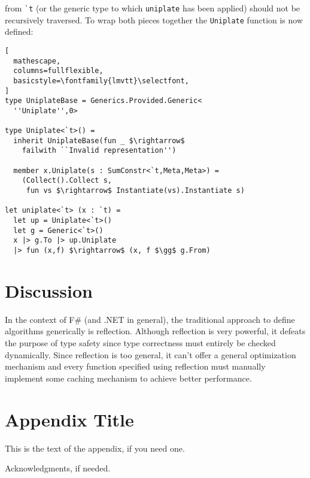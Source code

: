 \documentclass{sigplanconf}
\begin{document}
from \verb+`t+ (or the generic type to which \verb+uniplate+
has been applied) should not be recursively traversed.
To wrap both pieces together the \verb+Uniplate+ function
is now defined:
\begin{lstlisting}[
  mathescape,
  columns=fullflexible,
  basicstyle=\fontfamily{lmvtt}\selectfont,
]
type UniplateBase = Generics.Provided.Generic<
  ''Uniplate'',0>

type Uniplate<`t>() =
  inherit UniplateBase(fun _ $\rightarrow$ 
    failwith ``Invalid representation'')

  member x.Uniplate(s : SumConstr<`t,Meta,Meta>) =
    (Collect().Collect s,
     fun vs $\rightarrow$ Instantiate(vs).Instantiate s)

let uniplate<`t> (x : `t) =
  let up = Uniplate<`t>()
  let g = Generic<`t>()
  x |> g.To |> up.Uniplate
  |> fun (x,f) $\rightarrow$ (x, f $\gg$ g.From)

\end{lstlisting}

\section{Discussion}

In the context of F\# (and .NET in general), the traditional
approach to define algorithms generically is reflection. Although
reflection is very powerful, it defeats the purpose of type
safety since type correctness must entirely be checked dynamically.
Since reflection is too general, it can't offer a general optimization
mechanism and every function specified using reflection must
manually implement some caching mechanism to achieve better performance.



\appendix


\section{Appendix Title}

This is the text of the appendix, if you need one.

\acks

Acknowledgments, if needed.



\end{document}
